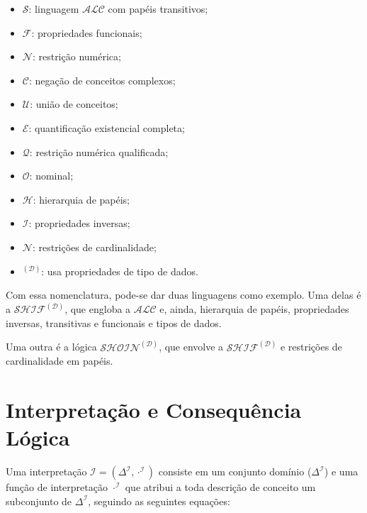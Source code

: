 \begin{itemize}
	\item $ \mathcal{S} $: linguagem $ \mathcal{ALC} $ com papéis transitivos;
	\item $ \mathcal{F} $: propriedades funcionais;
	\item $ \mathcal{N} $: restrição numérica;
	\item $ \mathcal{C} $: negação de conceitos complexos;
	\item $ \mathcal{U} $: união de conceitos;
	\item $ \mathcal{E} $: quantificação existencial completa;
	\item $ \mathcal{Q} $: restrição numérica qualificada;
	\item $ \mathcal{O} $: nominal;
	\item $ \mathcal{H} $: hierarquia de papéis;
	\item $ \mathcal{I} $: propriedades inversas;
	\item $ \mathcal{N} $: restrições de cardinalidade;
	\item $ ^\mathcal{(D)} $: usa propriedades de tipo de dados.
\end{itemize}

Com essa nomenclatura, pode-se dar duas linguagens como exemplo\cite{logicaResina}. Uma delas é a $ \mathcal{SHIF}^\mathcal{(D)} $, que engloba a $ \mathcal{ALC} $ e, ainda, hierarquia de papéis, propriedades inversas, transitivas e funcionais e tipos de dados.

Uma outra é a lógica $ \mathcal{SHOIN}^\mathcal{(D)}$, que envolve a  $ \mathcal{SHIF}^\mathcal{(D)} $ e restrições de cardinalidade em papéis.

\section{Interpretação e Consequência Lógica}

Uma interpretação $ \mathcal{I} = (\Delta^{\mathcal{I}}, \cdot^{\mathcal{I}})$ consiste em um conjunto domínio ($ \Delta^{\mathcal{I}} $) e uma função de interpretação $ \cdot^{\mathcal{I}} $ que atribui a toda descrição de conceito um subconjunto de $ \Delta^{\mathcal{I}} $, seguindo as seguintes equações\cite{logicaHorrocks}:

